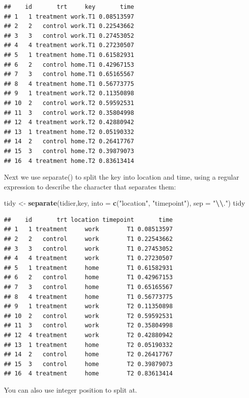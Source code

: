 \documentclass[
]{book}
\newenvironment{Shaded}{\begin{snugshade}}{\end{snugshade}}
\newcommand{\AttributeTok}[1]{\textcolor[rgb]{0.13,0.29,0.53}{#1}}
\newcommand{\FunctionTok}[1]{\textcolor[rgb]{0.13,0.29,0.53}{\textbf{#1}}}
\newcommand{\NormalTok}[1]{#1}
\newcommand{\OtherTok}[1]{\textcolor[rgb]{0.56,0.35,0.01}{#1}}
\newcommand{\SpecialCharTok}[1]{\textcolor[rgb]{0.81,0.36,0.00}{\textbf{#1}}}
\newcommand{\StringTok}[1]{\textcolor[rgb]{0.31,0.60,0.02}{#1}}
\begin{document}
\begin{verbatim}
##    id       trt     key       time
## 1   1 treatment work.T1 0.08513597
## 2   2   control work.T1 0.22543662
## 3   3   control work.T1 0.27453052
## 4   4 treatment work.T1 0.27230507
## 5   1 treatment home.T1 0.61582931
## 6   2   control home.T1 0.42967153
## 7   3   control home.T1 0.65165567
## 8   4 treatment home.T1 0.56773775
## 9   1 treatment work.T2 0.11350898
## 10  2   control work.T2 0.59592531
## 11  3   control work.T2 0.35804998
## 12  4 treatment work.T2 0.42880942
## 13  1 treatment home.T2 0.05190332
## 14  2   control home.T2 0.26417767
## 15  3   control home.T2 0.39879073
## 16  4 treatment home.T2 0.83613414
\end{verbatim}

Next we use separate() to split the key into location and time, using a regular expression to describe the character that separates them:

\begin{Shaded}
\begin{Highlighting}[]
\NormalTok{tidy }\OtherTok{\textless{}{-}} \FunctionTok{separate}\NormalTok{(tidier,key, }\AttributeTok{into =} \FunctionTok{c}\NormalTok{(}\StringTok{"location"}\NormalTok{, }\StringTok{"timepoint"}\NormalTok{), }\AttributeTok{sep =} \StringTok{"}\SpecialCharTok{\textbackslash{}\textbackslash{}}\StringTok{."}\NormalTok{)}
\NormalTok{tidy}
\end{Highlighting}
\end{Shaded}

\begin{verbatim}
##    id       trt location timepoint       time
## 1   1 treatment     work        T1 0.08513597
## 2   2   control     work        T1 0.22543662
## 3   3   control     work        T1 0.27453052
## 4   4 treatment     work        T1 0.27230507
## 5   1 treatment     home        T1 0.61582931
## 6   2   control     home        T1 0.42967153
## 7   3   control     home        T1 0.65165567
## 8   4 treatment     home        T1 0.56773775
## 9   1 treatment     work        T2 0.11350898
## 10  2   control     work        T2 0.59592531
## 11  3   control     work        T2 0.35804998
## 12  4 treatment     work        T2 0.42880942
## 13  1 treatment     home        T2 0.05190332
## 14  2   control     home        T2 0.26417767
## 15  3   control     home        T2 0.39879073
## 16  4 treatment     home        T2 0.83613414
\end{verbatim}

You can also use integer position to split at.
\end{document}
